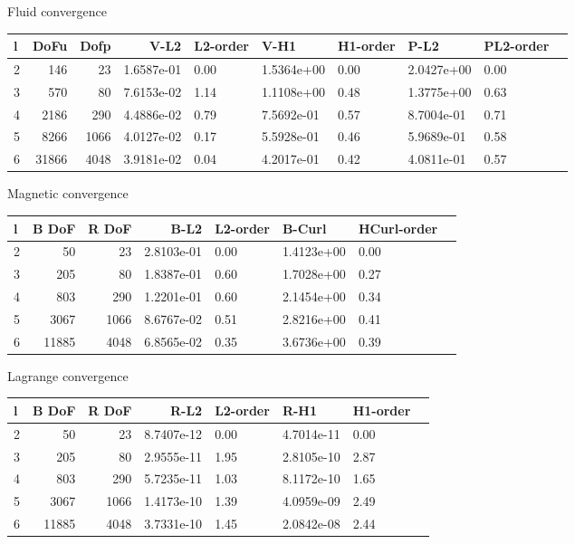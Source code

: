 \documentclass{article}
\begin{document}
Fluid convergence

\begin{tabular}{lrrrllllll}
\hline
 l &   DoFu &  Dofp &        V-L2 & L2-order &        V-H1 & H1-order &        P-L2 & PL2-order \\
\hline
 2 &    146 &    23 &  1.6587e-01 &     0.00 &  1.5364e+00 &     0.00 &  2.0427e+00 &      0.00 \\
 3 &    570 &    80 &  7.6153e-02 &     1.14 &  1.1108e+00 &     0.48 &  1.3775e+00 &      0.63 \\
 4 &   2186 &   290 &  4.4886e-02 &     0.79 &  7.5692e-01 &     0.57 &  8.7004e-01 &      0.71 \\
 5 &   8266 &  1066 &  4.0127e-02 &     0.17 &  5.5928e-01 &     0.46 &  5.9689e-01 &      0.58 \\
 6 &  31866 &  4048 &  3.9181e-02 &     0.04 &  4.2017e-01 &     0.42 &  4.0811e-01 &      0.57 \\
\hline
\end{tabular}



   Magnetic convergence

\begin{tabular}{lrrrllll}
\hline
 l &  B DoF &  R DoF &        B-L2 & L2-order &      B-Curl & HCurl-order \\
\hline
 2 &     50 &     23 &  2.8103e-01 &     0.00 &  1.4123e+00 &        0.00 \\
 3 &    205 &     80 &  1.8387e-01 &     0.60 &  1.7028e+00 &        0.27 \\
 4 &    803 &    290 &  1.2201e-01 &     0.60 &  2.1454e+00 &        0.34 \\
 5 &   3067 &   1066 &  8.6767e-02 &     0.51 &  2.8216e+00 &        0.41 \\
 6 &  11885 &   4048 &  6.8565e-02 &     0.35 &  3.6736e+00 &        0.39 \\
\hline
\end{tabular}



   Lagrange convergence

\begin{tabular}{lrrrllll}
\hline
  l &  B DoF &  R DoF &        R-L2 & L2-order &        R-H1 & H1-order \\
\hline
  2 &     50 &     23 &  8.7407e-12 &     0.00 &  4.7014e-11 &     0.00 \\
  3 &    205 &     80 &  2.9555e-11 &     1.95 &  2.8105e-10 &     2.87 \\
  4 &    803 &    290 &  5.7235e-11 &     1.03 &  8.1172e-10 &     1.65 \\
  5 &   3067 &   1066 &  1.4173e-10 &     1.39 &  4.0959e-09 &     2.49 \\
  6 &  11885 &   4048 &  3.7331e-10 &     1.45 &  2.0842e-08 &     2.44 \\
\hline
\end{tabular}
\end{document}
